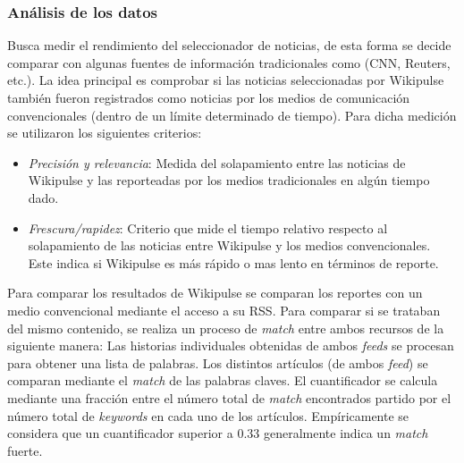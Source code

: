 \subsubsection{Análisis de los datos}
Busca medir el rendimiento del seleccionador de noticias, de esta forma se decide comparar con algunas fuentes de información tradicionales como (CNN, Reuters, etc.). La idea principal es comprobar si las noticias seleccionadas por Wikipulse también fueron registrados como noticias por los medios de comunicación convencionales (dentro de un límite determinado de tiempo). Para dicha medición se utilizaron los siguientes criterios:

\begin{itemize}
	\item \textit{Precisión y relevancia}:
	Medida del solapamiento entre las noticias de Wikipulse y las reporteadas por los medios tradicionales en algún tiempo dado.
	\item \textit{Frescura/rapidez}:
	Criterio que mide el tiempo relativo respecto al solapamiento de las noticias entre Wikipulse y los medios convencionales. Este indica si Wikipulse es más rápido o mas lento en términos de reporte.
\end{itemize}

Para comparar los resultados de Wikipulse se comparan los reportes con un medio convencional mediante el acceso a su RSS. Para comparar si se trataban del mismo contenido, se realiza un proceso de \emph{match} entre ambos recursos de la siguiente manera: Las historias individuales obtenidas de ambos \emph{feeds} se procesan para obtener una lista de palabras. Los distintos artículos (de ambos \textit{feed}) se comparan mediante el \emph{match} de las palabras claves. El cuantificador se calcula mediante una fracción entre el número total de \textit{match} encontrados partido por el número total de \emph{keywords} en cada uno de los artículos. Empíricamente se considera que un cuantificador superior a 0.33 generalmente indica un \emph{match} fuerte.
